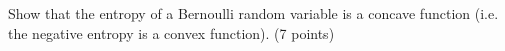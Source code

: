 \documentclass[fleqn]{homework}
\begin{document}
  \begin{problem}{5}
    \begin{question}
      Show that the entropy of a Bernoulli random variable is a concave function
      (i.e. the negative entropy is a convex function). (7 points)
    \end{question}
  \end{problem}
\end{document}
